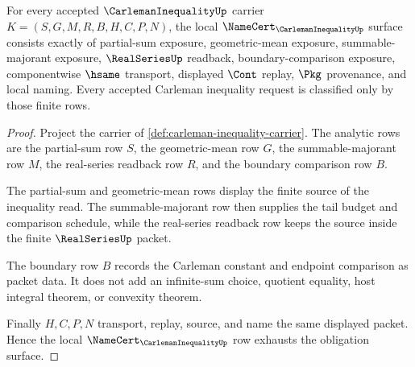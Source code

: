 \begin{theorem}\label{thm:carleman-inequality-namecert-obligations}
For every accepted $\CarlemanInequalityUp$ carrier $K=(S,G,M,R,B,H,C,P,N)$, the local $\NameCert_{\CarlemanInequalityUp}$ surface consists exactly of partial-sum exposure, geometric-mean exposure, summable-majorant exposure, $\RealSeriesUp$ readback, boundary-comparison exposure, componentwise $\hsame$ transport, displayed $\Cont$ replay, $\Pkg$ provenance, and local naming. Every accepted Carleman inequality request is classified only by those finite rows.
\end{theorem}
\begin{proof}
Project the carrier of \autoref{def:carleman-inequality-carrier}. The analytic rows are the partial-sum row $S$, the geometric-mean row $G$, the summable-majorant row $M$, the real-series readback row $R$, and the boundary comparison row $B$.

The partial-sum and geometric-mean rows display the finite source of the inequality read. The summable-majorant row then supplies the tail budget and comparison schedule, while the real-series readback row keeps the source inside the finite $\RealSeriesUp$ packet.

The boundary row $B$ records the Carleman constant and endpoint comparison as packet data. It does not add an infinite-sum choice, quotient equality, host integral theorem, or convexity theorem.

Finally $H,C,P,N$ transport, replay, source, and name the same displayed packet. Hence the local $\NameCert_{\CarlemanInequalityUp}$ row exhausts the obligation surface.
\end{proof}




